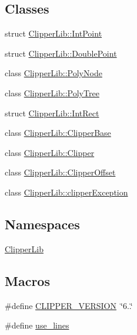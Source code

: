 \subsection*{Classes}
\begin{DoxyCompactItemize}
\item 
struct \mbox{\hyperlink{struct_clipper_lib_1_1_int_point}{Clipper\+Lib\+::\+Int\+Point}}
\item 
struct \mbox{\hyperlink{struct_clipper_lib_1_1_double_point}{Clipper\+Lib\+::\+Double\+Point}}
\item 
class \mbox{\hyperlink{class_clipper_lib_1_1_poly_node}{Clipper\+Lib\+::\+Poly\+Node}}
\item 
class \mbox{\hyperlink{class_clipper_lib_1_1_poly_tree}{Clipper\+Lib\+::\+Poly\+Tree}}
\item 
struct \mbox{\hyperlink{struct_clipper_lib_1_1_int_rect}{Clipper\+Lib\+::\+Int\+Rect}}
\item 
class \mbox{\hyperlink{class_clipper_lib_1_1_clipper_base}{Clipper\+Lib\+::\+Clipper\+Base}}
\item 
class \mbox{\hyperlink{class_clipper_lib_1_1_clipper}{Clipper\+Lib\+::\+Clipper}}
\item 
class \mbox{\hyperlink{class_clipper_lib_1_1_clipper_offset}{Clipper\+Lib\+::\+Clipper\+Offset}}
\item 
class \mbox{\hyperlink{class_clipper_lib_1_1clipper_exception}{Clipper\+Lib\+::clipper\+Exception}}
\end{DoxyCompactItemize}
\subsection*{Namespaces}
\begin{DoxyCompactItemize}
\item 
 \mbox{\hyperlink{namespace_clipper_lib}{Clipper\+Lib}}
\end{DoxyCompactItemize}
\subsection*{Macros}
\begin{DoxyCompactItemize}
\item 
\#define \mbox{\hyperlink{clipper_8hh_a613f7ecb44b1e27f0045d351d221bc79}{C\+L\+I\+P\+P\+E\+R\+\_\+\+V\+E\+R\+S\+I\+ON}}~\char`\"{}6..\char`\"{}
\item 
\#define \mbox{\hyperlink{clipper_8hh_a64da78e55d3fed37bd313ab82245a96a}{use\+\_\+lines}}
\end{DoxyCompactItemize}
